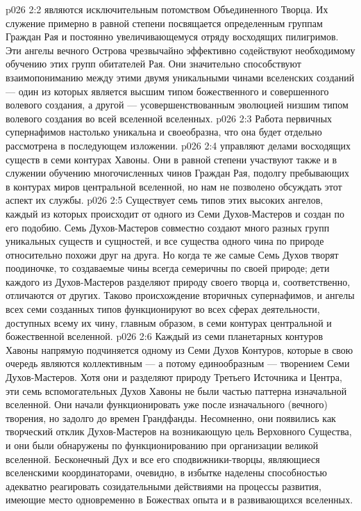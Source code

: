 \vs p026 2:2 \pc {} являются исключительным потомством Объединенного Творца. Их служение примерно в равной степени посвящается определенным группам Граждан Рая и постоянно увеличивающемуся отряду восходящих пилигримов. Эти ангелы вечного Острова чрезвычайно эффективно содействуют необходимому обучению этих групп обитателей Рая. Они значительно способствуют взаимопониманию между этими двумя уникальными чинами вселенских созданий --- один из которых является высшим типом божественного и совершенного волевого создания, а другой --- усовершенствованным эволюцией низшим типом волевого создания во всей вселенной вселенных.
\vs p026 2:3 \pc Работа первичных супернафимов настолько уникальна и своеобразна, что она будет отдельно рассмотрена в последующем изложении.
\vs p026 2:4 \pc {} управляют делами восходящих существ в семи контурах Хавоны. Они в равной степени участвуют также и в служении обучению многочисленных чинов Граждан Рая, подолгу пребывающих в контурах миров центральной вселенной, но нам не позволено обсуждать этот аспект их службы.
\vs p026 2:5 \pc Существует семь типов этих высоких ангелов, каждый из которых происходит от одного из Семи Духов\hyp{}Мастеров и создан по его подобию. Семь Духов\hyp{}Мастеров совместно создают много разных групп уникальных существ и сущностей, и все существа одного чина по природе относительно похожи друг на друга. Но когда те же самые Семь Духов творят поодиночке, то создаваемые чины всегда семеричны по своей природе; дети каждого из Духов\hyp{}Мастеров разделяют природу своего творца и, соответственно, отличаются от других. Таково происхождение вторичных супернафимов, и ангелы всех семи созданных типов функционируют во всех сферах деятельности, доступных всему их чину, главным образом, в семи контурах центральной и божественной вселенной.
\vs p026 2:6 \pc Каждый из семи планетарных контуров Хавоны напрямую подчиняется одному из Семи Духов Контуров, которые в свою очередь являются коллективным --- а потому единообразным --- творением Семи Духов\hyp{}Мастеров. Хотя они и разделяют природу Третьего Источника и Центра, эти семь вспомогательных Духов Хавоны не были частью паттерна изначальной вселенной. Они начали функционировать уже после изначального (вечного) творения, но задолго до времен Грандфанды. Несомненно, они появились как творческий отклик Духов\hyp{}Мастеров на возникающую цель Верховного Существа, и они были обнаружены по функционированию при организации великой вселенной. Бесконечный Дух и все его сподвижники\hyp{}творцы, являющиеся вселенскими координаторами, очевидно, в избытке наделены способностью адекватно реагировать созидательными действиями на процессы развития, имеющие место одновременно в Божествах опыта и в развивающихся вселенных.
